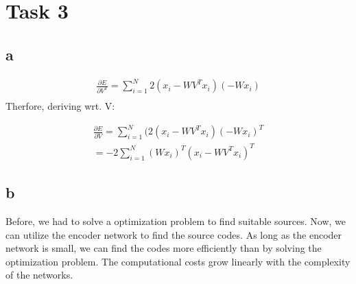 \section*{Task 3}

\subsection*{a}

\begin{gather*}
\frac{\partial E}{\partial V^T} = \sum^N_{i=1} 2(x_i - W V^T x_i) (-W x_i) \\
\end{gather*}
Therfore, deriving wrt. V:

\begin{gather*}
    \frac{\partial E}{\partial V} = \sum^N_{i=1} (2(x_i - W V^T x_i) (-W x_i)^T \\
    = -2 \sum^N_{i=1} (W x_i)^T (x_i - W V^T x_i)^T
\end{gather*}

\subsection*{b}

Before, we had to solve a optimization problem to find suitable sources. Now, we
can utilize the encoder network to find the source codes. As long as the
encoder network is small, we can find the codes more efficiently than by solving
the optimization problem. The computational costs grow linearly with the complexity
of the networks.
